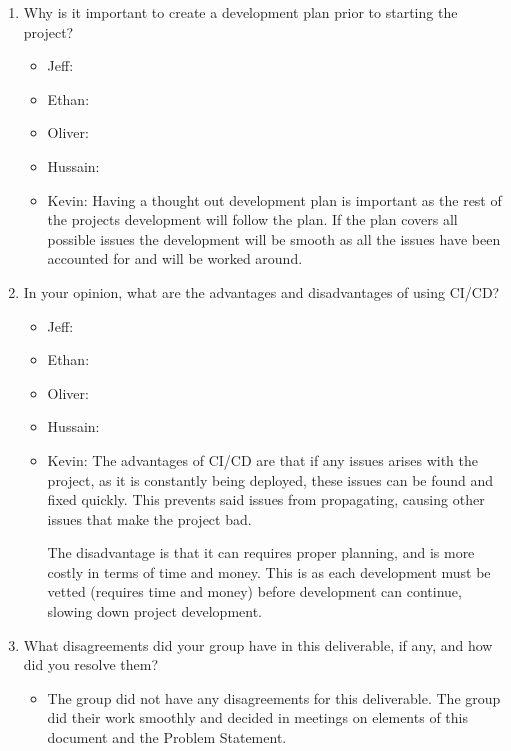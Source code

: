 \documentclass{article}
\begin{document}
\begin{enumerate}
    \item Why is it important to create a development plan prior to starting the
    project?
	\begin{itemize}
		\item Jeff:
		\item Ethan:
		\item Oliver:
		\item Hussain:
		\item Kevin: Having a thought out development plan is important as the rest of the projects development will follow the plan. If the plan covers all possible issues the development will be smooth as all the issues have been accounted for and will be worked around. 
	\end{itemize}
    \item In your opinion, what are the advantages and disadvantages of using
    CI/CD?
	\begin{itemize}
		\item Jeff:
		\item Ethan:
		\item Oliver:
		\item Hussain:
		\item Kevin: The advantages of CI/CD are that if any issues arises with the project, as it is constantly being deployed, these issues can be found and fixed quickly. This prevents said issues from propagating, causing other issues that make the project bad.
		
		The disadvantage is that it can requires proper planning, and is more costly in terms of time and money. This is as each development must be vetted (requires time and money) before development can continue, slowing down project development. 


	\end{itemize}
    \item What disagreements did your group have in this deliverable, if any,
    and how did you resolve them?
    
   \begin{itemize}
		\item The group did not have any disagreements for this deliverable. The group did their work smoothly and decided in meetings on elements of this document and the Problem Statement.
	\end{itemize}
\end{enumerate}

\newpage{}
\end{document}
